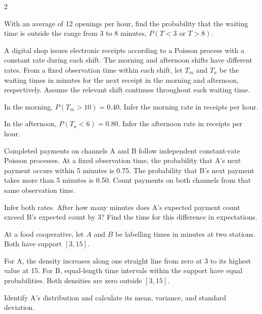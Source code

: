 \begin{multicols}{2}
\begin{minipage}{\linewidth}
With an average of 12 openings per hour, find the probability that the waiting time is outside the range from 3 to 8 minutes, $P(T<3\text{ or }T>8)$. 

\end{minipage}\par
\begin{minipage}{\linewidth}
A digital shop issues electronic receipts according to a Poisson process with a constant rate during each shift. The morning and afternoon shifts have different rates. From a fixed observation time within each shift, let $T_m$ and $T_a$ be the waiting times in minutes for the next receipt in the morning and afternoon, respectively. Assume the relevant shift continues throughout each waiting time.

In the morning, $P(T_m>10)=0.40$. Infer the morning rate in receipts per hour. 

In the afternoon, $P(T_a<6)=0.80$. Infer the afternoon rate in receipts per hour. 

\end{minipage}\par
\begin{minipage}{\linewidth}
Completed payments on channels A and B follow independent constant-rate Poisson processes. At a fixed observation time, the probability that A's next payment occurs within 5 minutes is 0.75. The probability that B's next payment takes more than 5 minutes is 0.50. Count payments on both channels from that same observation time.

Infer both rates. After how many minutes does A's expected payment count exceed B's expected count by 3? Find the time for this difference in expectations. 

\end{minipage}\par
\begin{minipage}{\linewidth}
At a food cooperative, let $A$ and $B$ be labelling times in minutes at two stations. Both have support $[3,15]$.

For A, the density increases along one straight line from zero at 3 to its highest value at 15. For B, equal-length time intervals within the support have equal probabilities. Both densities are zero outside $[3,15]$.

Identify A's distribution and calculate its mean, variance, and standard deviation. 


\end{minipage}
\end{multicols}
